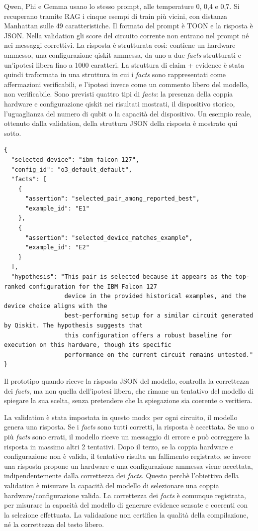Qwen, Phi e Gemma usano lo stesso prompt, alle temperature 0, 0,4 e 0,7. Si recuperano tramite RAG i cinque esempi di train più vicini, con distanza Manhattan sulle 49 caratteristiche. Il formato del prompt è TOON e la risposta è JSON. Nella validation gli score del circuito corrente non entrano nel prompt né nei messaggi correttivi.
La risposta è strutturata così: contiene un hardware ammesso, una configurazione qiskit ammessa, da uno a due \textit{facts} strutturati e un'ipotesi libera fino a 1000 caratteri. La struttura di claim + evidence è stata quindi traformata in una struttura in cui i \textit{facts} sono rappresentati come affermazioni verificabili, e l'ipotesi invece come un commento libero del modello, non verificabile. Sono previsti quattro tipi di \textit{facts}:  la presenza della coppia hardware e configurazione qiskit nei risultati mostrati, il dispositivo storico, l'uguaglianza del numero di qubit o la capacità del dispositivo.
Un esempio reale, ottenuto dalla validation, della struttura JSON della risposta è mostrato qui sotto.
{\scriptsize
\begin{verbatim}
{
  "selected_device": "ibm_falcon_127",
  "config_id": "o3_default_default",
  "facts": [
    {
      "assertion": "selected_pair_among_reported_best",
      "example_id": "E1"
    },
    {
      "assertion": "selected_device_matches_example",
      "example_id": "E2"
    }
  ],
  "hypothesis": "This pair is selected because it appears as the top-ranked configuration for the IBM Falcon 127 
                 device in the provided historical examples, and the device choice aligns with the 
                 best-performing setup for a similar circuit generated by Qiskit. The hypothesis suggests that
                 this configuration offers a robust baseline for execution on this hardware, though its specific
                 performance on the current circuit remains untested."
}
\end{verbatim}
}
Il prototipo quando riceve la risposta JSON del modello, controlla la correttezza dei \textit{facts}, ma non quella dell'ipotesi libera, che rimane un tentativo del modello di spiegare la sua scelta, senza pretendere che la spiegazione sia coerente o veritiera.

La validation è stata impostata in questo modo: per ogni circuito, il modello genera una risposta. Se i \textit{facts} sono tutti corretti, la risposta è accettata. Se uno o più \textit{facts} sono errati, il modello riceve un messaggio di errore e può correggere la risposta in massimo altri 2 tentativi.
Dopo il terzo, se la coppia hardware e configurazione non è valida, il tentativo risulta un fallimento registrato, se invece una risposta propone un hardware e una configurazione ammessa viene accettata, indipendentemente dalla correttezza dei \textit{facts}. Questo perchè l'obiettivo della validation è misurare la capacità del modello di selezionare una coppia hardware/configurazione valida.
La correttezza dei \textit{facts} è comunque registrata, per misurare la capacità del modello di generare evidence sensate e coerenti con la selezione effettuata. La validazione non certifica la qualità della compilazione, né la correttezza del testo libero.

